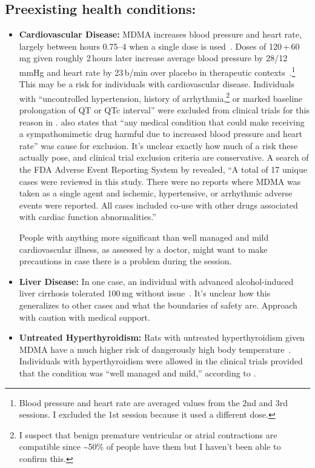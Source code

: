 \documentclass[11pt,oneside]{book}
\let\cite\parencite
\begin{document}
\subsection*{Preexisting health conditions:}
\begin{itemize}
    \item \textbf{Cardiovascular Disease:} MDMA increases blood pressure and heart rate, largely between hours 0.75--4 when a single dose is used~\cite{studerus2010psychometric}. Doses of 120\,+\,60\,mg given roughly 2\,hours later increase average blood pressure by 28/12\,mmHg and heart rate by 23\,b/min over placebo in therapeutic contexts~\cite{mitchellMDMAClinicalTrial}.\footnote{Blood pressure and heart rate are averaged values from the 2nd and 3rd sessions. I excluded the 1st session because it used a different dose.} This may be a risk for individuals with cardiovascular disease. Individuals with \enquote{uncontrolled hypertension, history of arrhythmia,\footnote{I suspect that benign premature ventricular or atrial contractions are compatible since \textasciitilde50\% of people have them but I haven't been able to confirm this.} or marked baseline prolongation of QT or QTc interval} were excluded from clinical trials for this reason in \textcite[Supplementary Information; p. 5]{mitchellMDMAClinicalTrial2}. \textcite[sec. Methods]{mitchellMDMAClinicalTrial} also states that \enquote{any medical condition that could make receiving a sympathomimetic drug harmful due to increased blood pressure and heart rate} was cause for exclusion. It's unclear exactly how much of a risk these actually pose, and clinical trial exclusion criteria are conservative. A search of the FDA Adverse Event Reporting System by \textcite[p. 2]{makunts2023concomitant} revealed, \enquote{A total of 17 unique cases were reviewed in this study. There were no reports where MDMA was taken as a single agent and ischemic, hypertensive, or arrhythmic adverse events were reported. All cases included co-use with other drugs associated with cardiac function abnormalities.}

    People with anything more significant than well managed and mild cardiovascular illness, as assessed by a doctor, might want to make precautions in case there is a problem during the session.
    \item \textbf{Liver Disease:} In one case, an individual with advanced alcohol-induced liver cirrhosis tolerated 100\,mg without issue~\cite{krausCirrhosis}. It's unclear how this generalizes to other cases and what the boundaries of safety are. Approach with caution with medical support.
    \item \textbf{Untreated Hyperthyroidism:} Rats with untreated hyperthyroidism given MDMA have a much higher risk of dangerously high body temperature~\cite{shokryHyperthyroidism}. Individuals with hyperthyroidism were allowed in the clinical trials provided that the condition was \enquote{well managed and mild,} according to \textcite[Supplementary Information; p. 5]{mitchellMDMAClinicalTrial2}.
\end{itemize}
\end{document}

